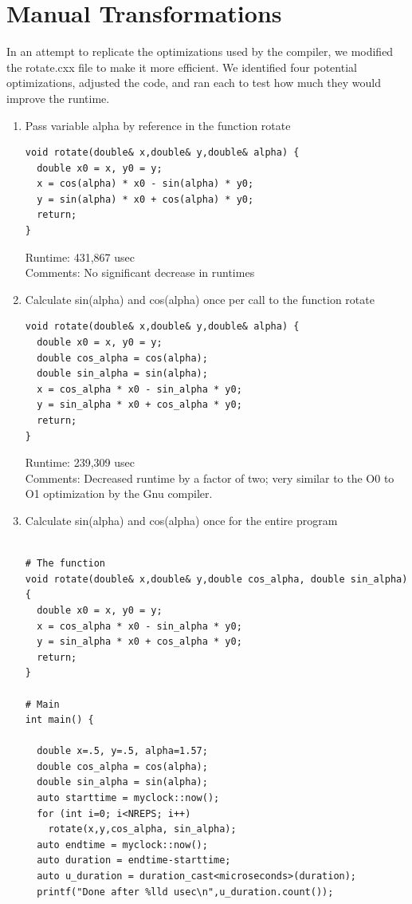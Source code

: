 \documentclass{report}
\begin{document}
\section*{Manual Transformations}
In an attempt to replicate the optimizations used by the compiler, we modified the rotate.cxx file to make it more efficient.  We identified four potential optimizations, adjusted the code, and ran each to test how much they would improve the runtime.

\begin{enumerate}

\item Pass variable alpha by reference in the function rotate
\begin{lstlisting}
void rotate(double& x,double& y,double& alpha) {
  double x0 = x, y0 = y;
  x = cos(alpha) * x0 - sin(alpha) * y0;
  y = sin(alpha) * x0 + cos(alpha) * y0;
  return;
}
\end{lstlisting}
Runtime: 431,867 usec
\\Comments: No significant decrease in runtimes

\vspace{12pt}
\item Calculate sin(alpha) and cos(alpha) once per call to the function rotate
\begin{lstlisting}
void rotate(double& x,double& y,double& alpha) {
  double x0 = x, y0 = y;
  double cos_alpha = cos(alpha);
  double sin_alpha = sin(alpha);
  x = cos_alpha * x0 - sin_alpha * y0;
  y = sin_alpha * x0 + cos_alpha * y0;
  return;
}
\end{lstlisting}
Runtime: 239,309 usec
\\Comments: Decreased runtime by a factor of two; very similar to the O0 to O1 optimization by the Gnu compiler.

\vspace{12pt}
\item Calculate sin(alpha) and cos(alpha) once for the entire program
\begin{lstlisting}

# The function
void rotate(double& x,double& y,double cos_alpha, double sin_alpha) {
  double x0 = x, y0 = y;
  x = cos_alpha * x0 - sin_alpha * y0;
  y = sin_alpha * x0 + cos_alpha * y0;
  return;
}

# Main
int main() {

  double x=.5, y=.5, alpha=1.57;
  double cos_alpha = cos(alpha);
  double sin_alpha = sin(alpha);
  auto starttime = myclock::now();
  for (int i=0; i<NREPS; i++)
    rotate(x,y,cos_alpha, sin_alpha);
  auto endtime = myclock::now();
  auto duration = endtime-starttime;
  auto u_duration = duration_cast<microseconds>(duration);
  printf("Done after %lld usec\n",u_duration.count());


\end{lstlisting}
\end{enumerate}
\end{document}
